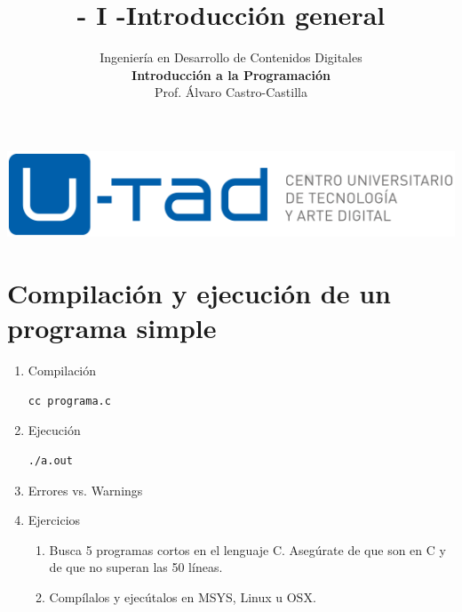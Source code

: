 \documentclass[a4paper,oneside]{article}
\title{- I -\linebreak Introducción general}
\author{Ingeniería en Desarrollo de Contenidos Digitales\\ \textbf{Introducción a la Programación}\\ Prof. Álvaro Castro-Castilla}
\date{}
\begin{document}
\maketitle

\begin{center}
\includegraphics[scale=0.3,resolution=300]{images/utad.png}
\end{center}


\section{Compilación y ejecución de un programa simple}
  \begin{enumerate}
  \item Compilación

    \begin{verbatim}
cc programa.c
    \end{verbatim}
  \item Ejecución

    \begin{verbatim}
./a.out
    \end{verbatim}
  \item Errores vs. Warnings
  \item Ejercicios
    \begin{enumerate}
    \item Busca 5 programas cortos en el lenguaje C. Asegúrate de que son en C y de que no superan las 50 líneas.
    \item Compílalos y ejecútalos en MSYS, Linux u OSX.
    \end{enumerate}
  \end{enumerate}
\end{document}
